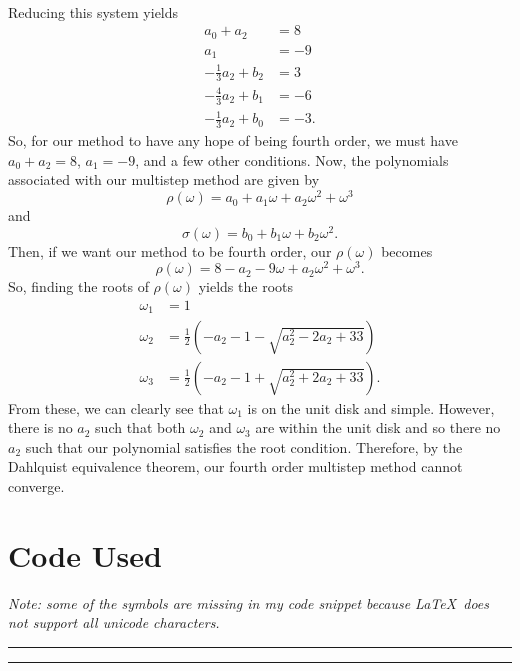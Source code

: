 \documentclass[a4paper,12pt]{article}
\begin{document}
\begin{enumerate}[label = (\arabic*)]
\begin{align*}
	\end{align*}
	Reducing this system yields
	\begin{align*}
		a_0 + a_2 &= 8 \\
		a_1 &= -9 \\
		-\frac{1}{3} a_2 + b_2 &= 3 \\
		-\frac{4}{3} a_2+ b_1 &= -6 \\
		-\frac{1}{3} a_2 + b_0 &= -3.
	\end{align*}
	So, for our method to have any hope of being fourth order, we must have $ a_0 + a_2 = 8 $, $ a_1 = -9 $, and a few other conditions. Now, the polynomials associated with our multistep method are given by
	\[
		\rho(\omega) = a_0 + a_1 \omega + a_2 \omega^2 + \omega^3
	\]
	and
	\[
		\sigma(\omega) = b_0 + b_1 \omega + b_2 \omega^2.
	\]
	Then, if we want our method to be fourth order, our $ \rho(\omega) $ becomes
	\[
		\rho(\omega) = 8 - a_2 - 9\omega + a_2 \omega^2 + \omega^3.
	\]
	So, finding the roots of $ \rho(\omega) $ yields the roots
	\begin{align*}
		\omega_1 &= 1 \\
		\omega_2 &= \frac{1}{2} \left(-a_2-1 - \sqrt{a_2^2 - 2 a_2+33}\right) \\
		\omega_3 &= \frac{1}{2} \left(-a_2-1 + \sqrt{a_2^2 + 2 a_2+33}\right).
	\end{align*}
	From these, we can clearly see that $ \omega_1 $ is on the unit disk and simple. However, there is no $ a_2 $ such that both $ \omega_2 $ and $ \omega_3 $ are within the unit disk and so there no $ a_2 $ such that our polynomial satisfies the root condition. Therefore, by the Dahlquist equivalence theorem, our fourth order multistep method cannot converge.
\end{enumerate}

\newpage
\section*{Code Used}
\vspace{-0.5cm}
\emph{Note: some of the symbols are missing in my code snippet because \LaTeX\ does not support all unicode characters.}

\vspace{-0.5cm}
\rule{\textwidth}{.4pt}
	
\rule{\textwidth}{.4pt}
\end{document}
